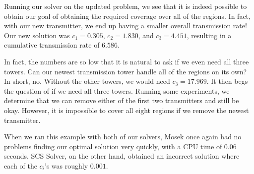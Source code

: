 	Running our solver on the updated problem, we see that it is indeed possible to obtain our goal of obtaining the required coverage over all of the regions. In fact, with our new transmitter, we end up having a smaller overall transmission rate! Our new solution was $c_1 = 0.305$, $c_2 = 1.830$, and $c_3 = 4.451$, resulting in a cumulative transmission rate of $6.586$.
	
	In fact, the numbers are so low that it is natural to ask if we even need all three towers. Can our newest transmission tower handle all of the regions on its own? In short, no. Without the other towers, we would need $c_3 = 17.969$. It then begs the question of if we need all three towers. Running some experiments, we determine that we can remove either of the first two transmitters and still be okay. However, it is impossible to cover all eight regions if we remove the newest transmitter.
	
	When we ran this example with both of our solvers, Mosek once again had no problems finding our optimal solution very quickly, with a CPU time of 0.06 seconds. SCS Solver, on the other hand, obtained an incorrect solution where each of the $c_i$'s was roughly $0.001$. 